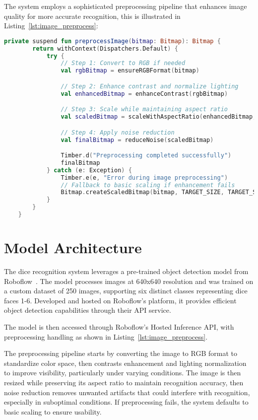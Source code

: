 The system employs a sophisticated preprocessing pipeline that enhances image quality for more accurate recognition, this is illustrated in Listing~\ref{lst:image_preprocess}:
\begin{lstlisting}[language=Kotlin, caption={Image Preprocessing Pipeline}, label=lst:image_preprocess]
    private suspend fun preprocessImage(bitmap: Bitmap): Bitmap {
        return withContext(Dispatchers.Default) {
            try {
                // Step 1: Convert to RGB if needed
                val rgbBitmap = ensureRGBFormat(bitmap)

                // Step 2: Enhance contrast and normalize lighting
                val enhancedBitmap = enhanceContrast(rgbBitmap)

                // Step 3: Scale while maintaining aspect ratio
                val scaledBitmap = scaleWithAspectRatio(enhancedBitmap, TARGET_SIZE)

                // Step 4: Apply noise reduction
                val finalBitmap = reduceNoise(scaledBitmap)

                Timber.d("Preprocessing completed successfully")
                finalBitmap
            } catch (e: Exception) {
                Timber.e(e, "Error during image preprocessing")
                // Fallback to basic scaling if enhancement fails
                Bitmap.createScaledBitmap(bitmap, TARGET_SIZE, TARGET_SIZE, true)
            }
        }
    }
\end{lstlisting}

\section{Model Architecture}

The dice recognition system leverages a pre-trained object detection model from Roboflow~\cite{bib:kavidataset}. The model processes images at 640x640 resolution and was trained on a custom dataset of 250 images, supporting six distinct classes representing dice faces 1-6. Developed and hosted on Roboflow's platform, it provides efficient object detection capabilities through their API service.

The model is then accessed through Roboflow's Hosted Inference API, with preprocessing handling as shown in Listing~\ref{lst:image_preprocess}.

The preprocessing pipeline starts by converting the image to RGB format to standardize color space, then contrasts enhancement and lighting normalization to improve visibility, particularly under varying conditions. The image is then resized while preserving its aspect ratio to maintain recognition accuracy, then noise reduction removes unwanted artifacts that could interfere with recognition, especially in suboptimal conditions. If preprocessing fails, the system defaults to basic scaling to ensure usability.

